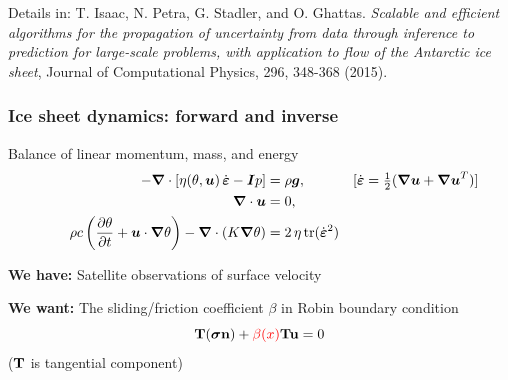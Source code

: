 \documentclass[10pt,final,xcolor=dvipsnames]{beamer}
\newcommand{\gbf}[1]{\boldsymbol{#1}}
\newcommand{\bs}[1]{\ensuremath{\boldsymbol{#1}}}
\newcommand{\edot}{\dot{\gbf{\varepsilon}}}
\newcommand{\tcr}[1]{\ensuremath{\textcolor{red}{{#1}}}}
\begin{document}
\begin{frame}
	\vspace{0.3in}
	\scriptsize{Details in: T. Isaac, N. Petra, G. Stadler, and
		O. Ghattas. {\em Scalable and efficient algorithms for the
			propagation of uncertainty from data through inference to
			prediction for large-scale problems, with application to flow of
			the Antarctic ice sheet}, Journal of Computational Physics, 296,
		348-368 (2015).}
\end{frame}

\begin{frame}
\frametitle{Ice sheet dynamics: forward and inverse}

\begin{block}{Balance of linear momentum, mass, and energy}
  \[
  \begin{aligned}
    - \gbf{\nabla} \cdot \left[ \eta(\theta,\gbf{u}) \, \edot
      -\gbf{I}p \right] &= \rho \gbf{g},
    &[\edot = \tfrac 12  (\gbf{\nabla u} + \gbf{\nabla  u}^T)]
    \hspace{-2em}
    \\
    \gbf{\nabla} \cdot \gbf{u} &= 0,
    \vspace{-2em} \\
    \rho c \left(\frac{\partial \theta}{\partial t} + \gbf{u} \cdot \gbf{\nabla}
    \theta\right)  - \gbf{\nabla} \cdot (K \gbf{\nabla} \theta)
    &= 2 \, \eta \, \mathrm{tr}(\edot^2)
  \end{aligned}
  \]
\end{block}
\vspace{0.5cm}
\textbf{We have:} Satellite observations of surface velocity

\vspace{0.5cm}

\textbf{We want:} The sliding/friction coefficient $\beta$ in
Robin boundary condition
\begin{equation*}
{\bf T}(\bs \sigma {\bf n}) + \tcr{\beta (x)}{\bf T}{\bf u} = 0
\end{equation*}
($\bf T$ is tangential component)

\end{frame}
\end{document}
